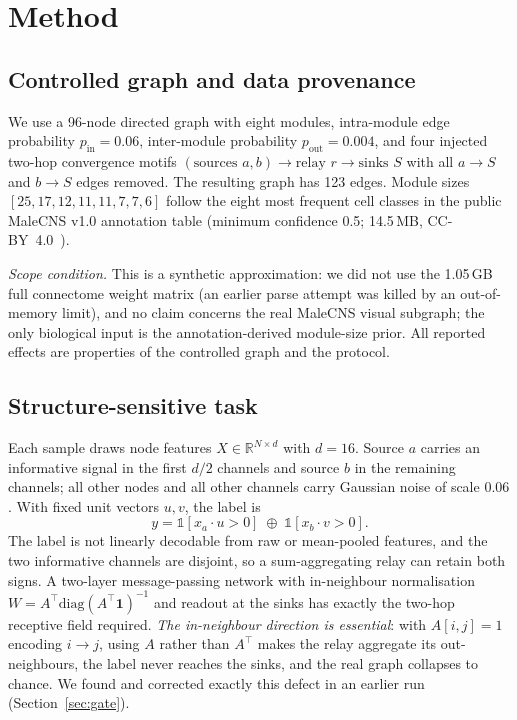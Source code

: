 \documentclass[10pt,twocolumn,letterpaper]{article}
\begin{document}
\section{Method}
\label{sec:method}

\subsection{Controlled graph and data provenance}
\label{sec:graph}

We use a 96-node directed graph with eight modules, intra-module edge
probability $p_{\text{in}}=0.06$, inter-module probability
$p_{\text{out}}=0.004$, and four injected two-hop convergence motifs
$(\text{sources } a,b)\to \text{relay } r\to \text{sinks } S$ with all
$a\!\to\!S$ and $b\!\to\!S$ edges removed. The resulting graph has 123 edges.
Module sizes $[25,17,12,11,11,7,7,6]$ follow the eight most frequent
cell classes in the public MaleCNS v1.0 annotation table (minimum confidence
0.5; 14.5\,MB, CC-BY~4.0~\cite{malecns2026}).

\emph{Scope condition.} This is a synthetic approximation: we did not use
the 1.05\,GB full connectome weight matrix (an earlier parse attempt was
killed by an out-of-memory limit), and no claim concerns the real MaleCNS
visual subgraph; the only biological input is the annotation-derived
module-size prior. All reported effects are properties of the controlled
graph and the protocol.

\subsection{Structure-sensitive task}
\label{sec:task}

Each sample draws node features $X\in\mathbb{R}^{N\times d}$ with $d=16$.
Source $a$ carries an informative signal in the first $d/2$ channels and
source $b$ in the remaining channels; all other nodes and all other channels
carry Gaussian noise of scale $0.06$. With fixed unit vectors $u,v$, the label
is
\begin{equation}
y = \mathbb{1}[x_a\!\cdot\! u > 0]\;\oplus\;\mathbb{1}[x_b\!\cdot\! v > 0].
\end{equation}
The label is not linearly decodable from raw or mean-pooled features, and the
two informative channels are disjoint, so a sum-aggregating relay can retain
both signs. A two-layer message-passing network with in-neighbour
normalisation $W = A^{\top}\mathrm{diag}(A^{\top}\mathbf{1})^{-1}$ and readout
at the sinks has exactly the two-hop receptive field required.
\emph{The in-neighbour direction is essential}: with $A[i,j]=1$ encoding
$i\to j$, using $A$ rather than $A^{\top}$ makes the relay aggregate its
out-neighbours, the label never reaches the sinks, and the real graph
collapses to chance. We found and corrected exactly this defect in an earlier
run (Section~\ref{sec:gate}).
\end{document}
